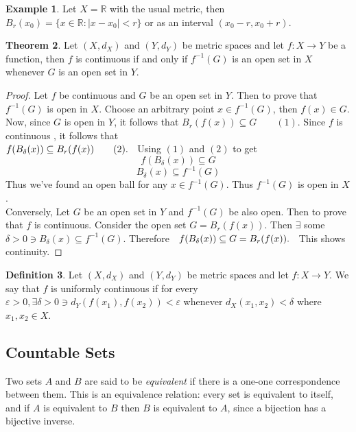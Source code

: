 \documentclass[11pt,a4paper]{article}
\theoremstyle{definition}
\newtheorem{thm}{Theorem}[section]
\newtheorem{defn}[thm]{Definition}
\newtheorem{exa}[thm]{Example}
\begin{document}
\begin{exa}
Let $X=\mathbb{R}$ with the usual metric, then $B_r(x_0)=\{x\in \mathbb{R}:|x-x_0|<r\}$ or as an interval $(x_0-r,x_0+r)$.

\end{exa}

\begin{thm}
Let $(X,d_X)$ and $(Y,d_Y)$ be metric spaces and let $f:X\rightarrow Y$ be a function, then $f$ is continuous if and only if $f^{-1}(G)$ is an open set in $X$ whenever $G$ is an open set in $Y$.

\end{thm}

\begin{proof}
Let $f$ be continuous and $G$ be an open set in $Y$. Then to prove that $f^{-1}(G)$ is open in $X$. Choose an arbitrary point $x\in f^{-1}(G)$, then $f(x)\in G$. Now, since $G$ is open in $Y$, it follows that $B_r(f(x))\subseteq G\qquad (1)$. Since $f$ is continuous , it follows that\\ $f(B_{\delta}(x))\subseteq B_r(f(x))\qquad (2).\hspace{0.2cm}$ Using $(1)$ and $(2)$ to get $$f(B_{\delta}(x))\subseteq G$$ $$B_{\delta}(x)\subseteq f^{-1}(G)$$ Thus we've found an open ball for any $x\in f^{-1}(G)$. Thus $f^{-1}(G)$ is open in $X$.\\ 
Conversely, Let $G$ be an open set in $Y$ and $f^{-1}(G)$ be also open. Then to prove that $f$ is continuous. Consider the open set $G=B_r(f(x))$. Then $\exists$ some $\delta >0\ni B_{\delta}(x)\subseteq f^{-1}(G)$. Therefore $\hspace{0.2cm} f(B_{\delta}(x))\subseteq G=B_r(f(x)).\hspace{0.2cm}$ This shows continuity.

\end{proof}


\begin{defn}
Let $(X,d_X)$ and $(Y,d_Y)$ be metric spaces and let $f:X\rightarrow Y$. We say that $f$ is uniformly continuous if for every $\varepsilon >0, \exists \delta >0\ni d_Y(f(x_1),f(x_2))<\varepsilon$ whenever $d_X(x_1,x_2)<\delta$ where $x_1,x_2\in X$.

\end{defn}


\subsection{Countable Sets}
Two sets $A$ and $B$ are said to be \emph{equivalent} if there is a one-one correspondence between them. This is an equivalence relation: every set is equivalent to itself, and if $A$ is equivalent to $B$ then $B$ is equivalent to $A$, since a bijection has a bijective inverse.
\end{document}
